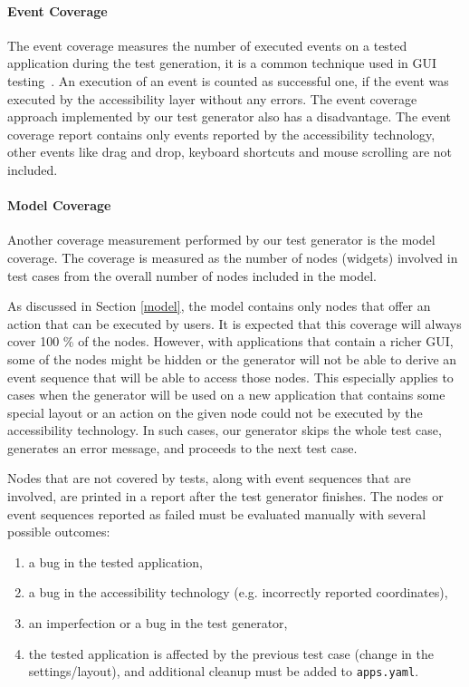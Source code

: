 \paragraph{Event Coverage} The event coverage measures the number of executed events on a tested application during the test generation, it is a common technique used in GUI testing~\cite{NguyenBao2014Gait}. An execution of an event is counted as successful one, if the event was executed by the accessibility layer without any errors. The event coverage approach implemented by our test generator also has a disadvantage. The event coverage report contains only events reported by the accessibility technology, other events like drag and drop, keyboard shortcuts and mouse scrolling are not included.

\paragraph{Model Coverage} Another coverage measurement performed by our test generator is the model coverage. The coverage is measured as the number of nodes (widgets) involved in test cases from the overall number of nodes included in the model.

As discussed in Section \ref{model}, the model contains only nodes that offer an action that can be executed by users. It is expected that this coverage will always cover 100 \% of the nodes. However, with applications that contain a richer GUI, some of the nodes might be hidden or the generator will not be able to derive an event sequence that will be able to access those nodes. This especially applies to cases when the generator will be used on a new application that contains some special layout or an action on the given node could not be executed by the accessibility technology. In such cases, our generator skips the whole test case, generates an error message, and proceeds to the next test case. 

Nodes that are not covered by tests, along with event sequences that are involved, are printed in a report after the test generator finishes. The nodes or event sequences reported as failed must be evaluated manually with several possible outcomes:

\begin{enumerate}
    \item a bug in the tested application,
    \item a bug in the accessibility technology (e.g. incorrectly reported coordinates),
    \item an imperfection or a bug in the test generator,
    \item the tested application is affected by the previous test case (change in the settings/layout), and additional cleanup must be added to \texttt{apps.yaml}.
\end{enumerate}

